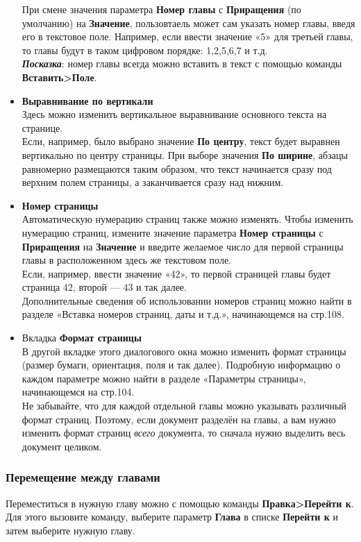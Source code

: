 \documentclass[a4paper,10pt]{article}
\begin{document}
\begin{itemize}
При смене значения параметра \textbf{Номер главы} с \textbf{Приращения} (по умолчанию) на \textbf{Значение}, пользовтаель может сам указать номер главы, введя его в текстовое поле. Например, если ввести значение «5» для третьей главы, то главы будут в таком цифровом порядке: 1,2,5,6,7 и т.д.\\
\textbf{\textit{Посказка}}: номер главы всегда можно вставить в текст с помощью команды \textbf{Вставить>Поле}.
\item \textbf{Выравнивание по вертикали}\\
Здесь можно изменить вертикальное выравнивание основного текста на странице.\\
Если,  например, было выбрано значение \textbf{По центру}, текст будет выравнен вертикально по центру страницы. При выборе значения \textbf{По ширине}, абзацы равномерно размещаются таким образом, что  текст начинается сразу под верхним полем страницы, а заканчивается сразу над нижним.
\item \textbf{Номер страницы}\\
Автоматическую нумерацию страниц также можно изменять. Чтобы изменить нумерацию страниц, измените значение параметра \textbf{Номер страницы} с \textbf{Приращения} на \textbf{Значение} и введите желаемое число для первой страницы главы в расположенном здесь же текстовом поле.\\
Если, например, ввести значение «42», то первой страницей главы будет страница 42, второй --- 43 и так далее.\\
Дополнительные сведения об использовании номеров страниц можно найти в разделе «Вставка номеров страниц, даты и т.д.», начинающемся на стр.108.
\item Вкладка \textbf{Формат страницы}\\
В другой вкладке этого диалогового окна можно изменить формат страницы (размер бумаги, ориентация, поля и так далее). Подробную информацию о каждом параметре можно найти в разделе «Параметры страницы», начинающемся на стр.104.\\
Не забывайте, что для каждой отдельной главы можно указывать различный формат страниц. Поэтому, если документ разделён на главы, а вам нужно изменить формат страниц \textit{всего} документа, то сначала нужно выделить весь документ целиком.
\end{itemize}

\subsubsection{Перемещение между главами}
Переместиться в нужную главу можно с помощью команды \textbf{Правка>Перейти к}. Для этого вызовите команду, выберите параметр \textbf{Глава} в списке \textbf{Перейти к} и затем выберите нужную главу.
\end{document}
